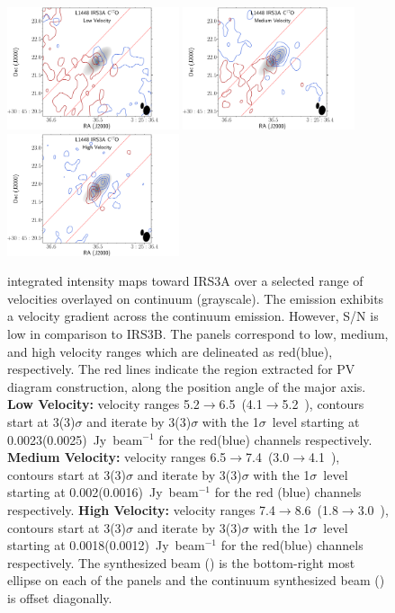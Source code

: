\begin{figure}[H]
\begin{center}
   \includegraphics[width=0.45\textwidth]{img/L1448IRS3B_C17O_image_taper1500k__-irs3asplitMoments_low_irs3a.pdf}
   \includegraphics[width=0.45\textwidth]{img/L1448IRS3B_C17O_image_taper1500k__-irs3asplitMoments_med_irs3a.pdf}
   \includegraphics[width=0.45\textwidth]{img/L1448IRS3B_C17O_image_taper1500k__-irs3asplitMoments_high_irs3a.pdf} 
\end{center}
   \caption{\cso\space integrated intensity maps toward IRS3A over a selected range of velocities overlayed on continuum (grayscale). The \cso\space emission exhibits a velocity gradient across the continuum emission. However, S/N is low in comparison to IRS3B. The panels correspond to low, medium, and high velocity ranges which are delineated as red(blue), respectively. The red lines indicate the region extracted for PV diagram construction, along the position angle of the major axis. \textbf{Low Velocity:} velocity ranges 5.2$\rightarrow$6.5~\kms (4.1$\rightarrow$5.2~\kms), contours start at 3(3)$\sigma$ and iterate by 3(3)$\sigma$ with the 1$\sigma$~level starting at 0.0023(0.0025)~Jy~beam$^{-1}$ for the red(blue) channels respectively. \textbf{Medium Velocity:}  velocity ranges 6.5$\rightarrow$7.4~\kms (3.0$\rightarrow$4.1~\kms), contours start at 3(3)$\sigma$ and iterate by 3(3)$\sigma$ with the 1$\sigma$~level starting at 0.002(0.0016)~Jy~beam$^{-1}$ for the red (blue) channels respectively. \textbf{High Velocity:} velocity ranges 7.4$\rightarrow$8.6~\kms (1.8$\rightarrow$3.0~\kms), contours start at 3(3)$\sigma$ and iterate by 3(3)$\sigma$ with the 1$\sigma$~level starting at 0.0018(0.0012)~Jy~beam$^{-1}$ for the red(blue) channels respectively. The \cso\space synthesized beam (\csobeam) is the bottom-right most ellipse on each of the panels and the continuum synthesized beam (\contbeam) is offset diagonally.}\label{fig:irs3ac17omoment}

\end{figure}
